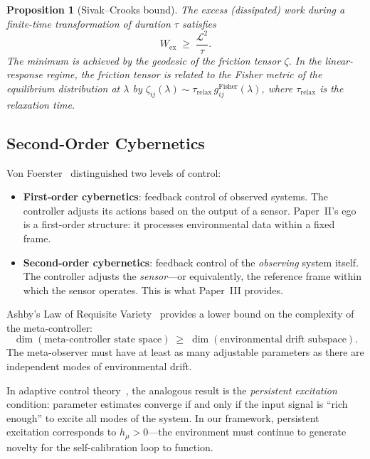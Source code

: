 \documentclass[12pt,a4paper,openany]{book}
\newtheorem{proposition}[theorem]{Proposition}
\begin{document}
\begin{proposition}[Sivak--Crooks bound]
\label{III-prop:sivak_crooks}
The excess (dissipated) work during a finite-time
transformation of duration $\tau$ satisfies~\cite{SivakCrooks2012}
\begin{equation}
\label{III-eq:sivak_crooks}
W_{\mathrm{ex}} \;\geq\; \frac{\mathcal{L}^2}{\tau}.
\end{equation}
The minimum is achieved by the geodesic of the friction
tensor $\zeta$.
In the linear-response regime, the friction tensor is
related to the Fisher metric of the equilibrium distribution
at $\lambda$ by
$\zeta_{ij}(\lambda)
\sim \tau_{\mathrm{relax}}\,g_{ij}^{\mathrm{Fisher}}(\lambda)$,
where $\tau_{\mathrm{relax}}$ is the relaxation time.
\end{proposition}

\subsection{Second-Order Cybernetics}
\label{III-subsec:cybernetics}

Von Foerster~\cite{vonFoerster2003} distinguished two levels
of control:
\begin{itemize}
\item \textbf{First-order cybernetics}: feedback control of
  observed systems.
  The controller adjusts its actions based on the output of
  a sensor.
  Paper~II's ego is a first-order structure: it processes
  environmental data within a fixed frame.
\item \textbf{Second-order cybernetics}: feedback control of
  the \emph{observing} system itself.
  The controller adjusts the \emph{sensor}---or equivalently,
  the reference frame within which the sensor operates.
  This is what Paper~III provides.
\end{itemize}

Ashby's Law of Requisite Variety~\cite{Ashby1956} provides a
lower bound on the complexity of the meta-controller:
\begin{equation}
\label{III-eq:requisite_variety}
\dim\!\left(\text{meta-controller state space}\right)
\;\geq\; \dim\!\left(\text{environmental drift subspace}\right).
\end{equation}
The meta-observer must have at least as many adjustable
parameters as there are independent modes of environmental
drift.

In adaptive control
theory~\cite{AstromWittenmark1995}, the analogous result is
the \emph{persistent excitation} condition: parameter
estimates converge if and only if the input signal is
``rich enough'' to excite all modes of the system.
In our framework, persistent excitation corresponds to
$h_\mu > 0$---the environment must continue to generate
novelty for the self-calibration loop to function.
\end{document}
